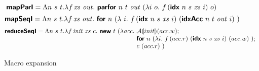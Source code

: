 \begin{figure}
\begin{displaymath}
    \bm{\mathsf{mapParI}}
    =
    \Lambda n~s~t.\lambda f\,\mathit{xs}~\mathit{out}.~
    \bm{\mathsf{parfor}}~n~t~\mathit{out}~(\lambda i~o.~f\,(\bm{\mathsf{idx}}~n~s~\mathit{xs}~i)~o)
  \end{displaymath}
  \begin{displaymath}
    \bm{\mathsf{mapSeqI}}
    =
    \Lambda n~s~t.\lambda f\,\mathit{xs}~\mathit{out}.~
    \bm{\mathsf{for}}~n~(\lambda~i.~f\,(\bm{\mathsf{idx}}~n~s~\mathit{xs}~i)~(\bm{\mathsf{idxAcc}}~n~t~\mathit{out}~i)\ )
  \end{displaymath}
  \begin{displaymath}
    \prim{reduceSeqI}
    =
    \Lambda n~\dtone~\dttwo.\lambda f\,\mathit{init}~\mathit{xs}~c.~\prim{new}~\dttwo~(\lambda \mathit{acc}.~
      \begin{array}[t]{@{}l}
      \semA{init}(acc.w);\\
      \prim{for}~n~(\lambda i.~f\,(acc.r)~(\ei)~(acc.w)\ );\\
      c~(acc.r)\ )
      \end{array}
\end{displaymath}
\caption{Macro expansion}  
\end{figure}
